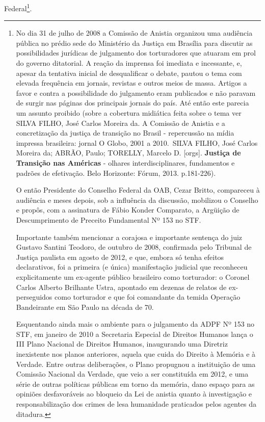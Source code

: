 Federal\footnote{No dia 31 de julho de 2008 a Comissão de Anistia
  organizou uma audiência pública no prédio sede do Ministério da
  Justiça em Brasília para discutir as possibilidades jurídicas de
  julgamento dos torturadores que atuaram em prol do governo ditatorial.
  A reação da imprensa foi imediata e incessante, e, apesar da tentativa
  inicial de desqualificar o debate, pautou o tema com elevada
  frequência em jornais, revistas e outros meios de massa. Artigos a
  favor e contra a possibilidade do julgamento eram publicados e não
  paravam de surgir nas páginas dos principais jornais do país. Até
  então este parecia um assunto proibido (sobre a cobertura midiática
  feita sobre o tema ver SILVA FILHO, José Carlos Moreira da. A Comissão
  de Anistia e a concretização da justiça de transição no Brasil -
  repercussão na mídia impressa brasileira: jornal O Globo, 2001 a
  2010.~SILVA FILHO, José Carlos Moreira da; ABRÃO, Paulo; TORELLY,
  Marcelo D. {[}orgs{]}. \textbf{Justiça de Transição nas Américas} -
  olhares interdisciplinares, fundamentos e padrões de efetivação. Belo
  Horizonte: Fórum, 2013. p.181-226).

  O então Presidente do Conselho Federal da OAB, Cezar Britto,
  compareceu à audiência e meses depois, sob a influência da discussão,
  mobilizou o Conselho e propôs, com a assinatura de Fábio Konder
  Comparato, a Argüição de Descumprimento de Preceito Fundamental Nº 153
  no STF.

  Importante também mencionar a corajosa e importante sentença do juiz
  Gustavo Santini Teodoro, de outubro de 2008, confirmada pelo Tribunal
  de Justiça paulista em agosto de 2012, e que, embora só tenha efeitos
  declarativos, foi a primeira (e única) manifestação judicial que
  reconheceu explicitamente um ex-agente público brasileiro como
  torturador: o Coronel Carlos Alberto Brilhante Ustra, apontado em
  dezenas de relatos de ex-perseguidos como torturador e que foi
  comandante da temida Operação Bandeirante em São Paulo na década de
  70.

  Esquentando ainda mais o ambiente para o julgamento da ADPF Nº 153 no
  STF, em janeiro de 2010 a Secretaria Especial de Direitos Humanos
  lança o III Plano Nacional de Direitos Humanos, inaugurando uma
  Diretriz inexistente nos planos anteriores, aquela que cuida do
  Direito à Memória e à Verdade. Entre outras deliberações, o Plano
  propugnou a instituição de uma Comissão Nacional da Verdade, que veio
  a ser constituída em 2012, e uma série de outras políticas públicas em
  torno da memória, dano espaço para as opiniões desfavoráveis ao
  bloqueio da Lei de anistia quanto à investigação e responsabilização
  dos crimes de lesa humanidade praticados pelos agentes da ditadura.}.

